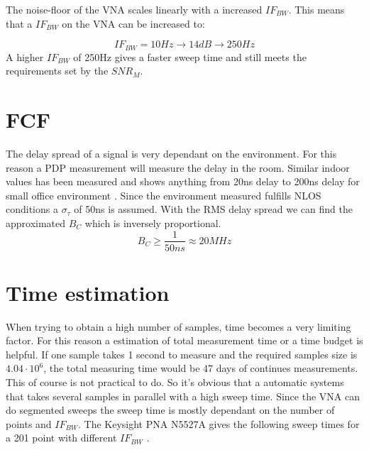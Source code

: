 The noise-floor of the \gls{VNA} scales linearly with a increased $IF_{BW}$\citep{PNA_scale}. This means that a $IF_{BW}$ on the \gls{VNA} can be increased to:

\begin{equation}
IF_{BW} = 10Hz \rightarrow 14dB \rightarrow 250Hz
\end{equation}
A higher $IF_{BW}$ of 250Hz  gives a faster sweep time and still meets the requirements set by the $SNR_M$.
\section{FCF}
The delay spread of a signal is very dependant on the environment. For this reason a PDP measurement will measure the delay in the room. Similar indoor values has been measured and shows anything from 20ns delay to 200ns delay for small office environment \citep{indoor_delay}. Since the environment measured fulfills NLOS conditions a $\sigma_{\tau}$ of 50ns is assumed. With the RMS delay spread we can find the approximated $B_C$ which is inversely proportional. 
\begin{equation}
B_C \geq \frac{1}{50ns} \approx 20MHz
\label{CohBW}
\end{equation}
\section{Time estimation}
When trying to obtain a high number of samples, time becomes a very limiting factor. For this reason a estimation of total measurement time or a time budget is helpful. If one sample takes 1 second to measure and the required samples size is $4.04 \cdot 10^6$, the total measuring time would be 47 days of continues measurements. This of course is not practical to do. So it's obvious that a automatic systems that takes several samples in parallel with a high sweep time.
Since the \gls{VNA} can do segmented sweeps the sweep time is mostly dependant on the number of points and $IF_{BW}$.
The Keysight PNA N5527A gives the following sweep times for a 201 point with different $IF_{BW}$ \citep{Key_PNA}. \\

